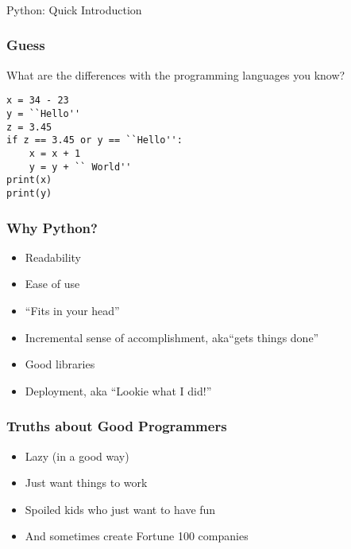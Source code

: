 \begin{frame}[fragile]\frametitle{}
\begin{center}
{\Large Python: Quick Introduction}
\end{center}
\end{frame}


\begin{frame}[fragile]\frametitle{Guess}
What are the differences with the programming languages you know?


\begin{lstlisting}
x = 34 - 23            
y = ``Hello''        
z = 3.45    
if z == 3.45 or y == ``Hello'':
	x = x + 1
	y = y + `` World''
print(x)
print(y)
\end{lstlisting}
\end{frame}

\begin{frame} \frametitle{Why Python?}
\begin{itemize}
\item  Readability
\item Ease of use
\item ``Fits in your head''
\item Incremental sense of accomplishment, aka``gets things done''
\item Good libraries
\item Deployment, aka ``Lookie what I did!''
\end{itemize}
\end{frame}

\begin{frame}[fragile]\frametitle{Truths about Good Programmers}
    \begin{itemize}
    \item Lazy (in a good way)
    \item Just want things to work
    \item Spoiled kids who just want to have fun
    \item And sometimes create Fortune 100 companies
    \end{itemize}
\end{frame}

